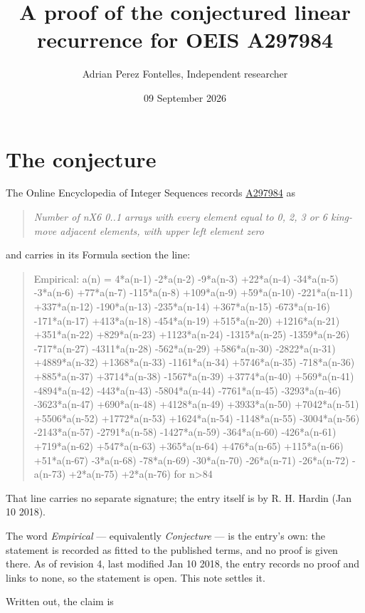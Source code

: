 \documentclass[11pt]{article}
\title{A proof of the conjectured linear recurrence for OEIS A297984}
\author{Adrian Perez Fontelles, Independent researcher}
\date{09 September 2026}
\theoremstyle{definition}
\begin{document}
\maketitle
\section{The conjecture}

The Online Encyclopedia of Integer Sequences records \href{https://oeis.org/A297984}{A297984} as

\begin{quote}\itshape Number of nX6 0..1 arrays with every element equal to 0, 2, 3 or 6 king-move adjacent elements, with upper left element zero\end{quote}

and carries in its Formula section the line:

\begin{quote}\ttfamily Empirical: a(n) = 4*a(n-1) -2*a(n-2) -9*a(n-3) +22*a(n-4) -34*a(n-5) -3*a(n-6) +77*a(n-7) -115*a(n-8) +109*a(n-9) +59*a(n-10) -221*a(n-11) +337*a(n-12) -190*a(n-13) -235*a(n-14) +367*a(n-15) -673*a(n-16) -171*a(n-17) +413*a(n-18) -454*a(n-19) +515*a(n-20) +1216*a(n-21) +351*a(n-22) +829*a(n-23) +1123*a(n-24) -1315*a(n-25) -1359*a(n-26) -717*a(n-27) -4311*a(n-28) -562*a(n-29) +586*a(n-30) -2822*a(n-31) +4889*a(n-32) +1368*a(n-33) -1161*a(n-34) +5746*a(n-35) -718*a(n-36) +885*a(n-37) +3714*a(n-38) -1567*a(n-39) +3774*a(n-40) +569*a(n-41) -4894*a(n-42) -443*a(n-43) -5804*a(n-44) -7761*a(n-45) -3293*a(n-46) -3623*a(n-47) +690*a(n-48) +4128*a(n-49) +3933*a(n-50) +7042*a(n-51) +5506*a(n-52) +1772*a(n-53) +1624*a(n-54) -1148*a(n-55) -3004*a(n-56) -2143*a(n-57) -2791*a(n-58) -1427*a(n-59) -364*a(n-60) -426*a(n-61) +719*a(n-62) +547*a(n-63) +365*a(n-64) +476*a(n-65) +115*a(n-66) +51*a(n-67) -3*a(n-68) -78*a(n-69) -30*a(n-70) -26*a(n-71) -26*a(n-72) -a(n-73) +2*a(n-75) +2*a(n-76) for n>84\end{quote}

That line carries no separate signature; the entry itself is by R. H. Hardin (Jan 10 2018).

The word {\itshape Empirical} --- equivalently {\itshape Conjecture} --- is the entry's own: the statement is recorded as fitted to the published terms, and no proof is given there. As of revision 4, last modified Jan 10 2018, the entry records no proof and links to none, so the statement is open. This note settles it.

Written out, the claim is
\end{document}
